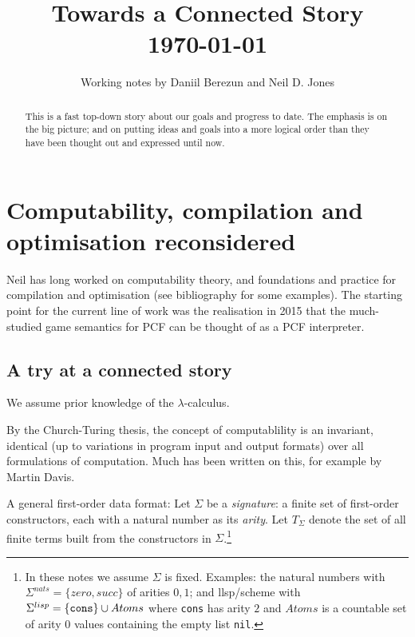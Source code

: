 \documentclass{llncs}
\title{Towards   a Connected Story \\
\today}
\author {Working notes by Daniil Berezun and Neil D. Jones}
\institute{DIKU}
\newcommand{\lc}{$\lambda$-calculus}
\begin{document}

\setcounter{tocdepth}{3}

\maketitle



\begin{abstract}
This is a fast top-down story about our goals and progress to date. 
The emphasis is on the big picture; and on putting ideas and goals into a more logical order than they have been thought out and expressed until now.
\end{abstract}

\section{Computability, compilation and optimisation reconsidered}

Neil has long worked on computability theory, and foundations and practice for compilation and optimisation (see bibliography for some examples).
The starting point for the current line of work was the realisation  in 2015 that the much-studied game semantics for PCF can be thought of as a PCF interpreter. 

\subsection*{A try at a connected story}

We assume prior knowledge of the \lc.

By the Church-Turing thesis, the concept of computablility is an invariant, identical (up to variations in program input and output formats) over all formulations of computation. Much has been written on this, for example by Martin Davis.

A general first-order data format: Let $\Sigma$ be a {\em signature}: a finite set of first-order constructors, each with a natural number as its {\em arity}. Let $T_\Sigma$ denote the set of all finite terms built from the constructors in 
$\Sigma$.\footnote
{In these notes we assume $\Sigma$ is fixed. Examples: the natural numbers with 
$\Sigma^{nats} = \{zero, succ\}$ of arities $0,1$; and {\sc llsp/scheme} with $\Sigma^{lisp} = \{{\tt cons}\}\cup Atoms$ where {\tt cons} has arity $2$ and $Atoms$ is a  countable set of arity $0$ values  containing the empty list {\tt nil}.
}
\end{document}
